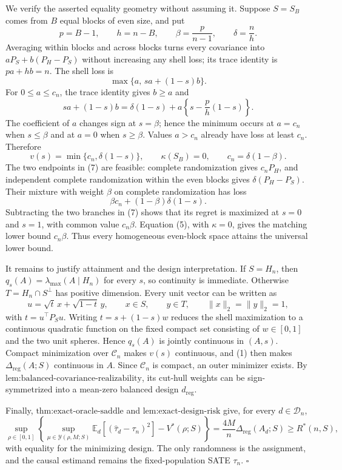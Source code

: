 We verify the asserted equality geometry without assuming it.  Suppose \(S=S_B\) comes from \(B\) equal blocks of even size, and put
\[
p=B-1,
\qquad
h=n-B,
\qquad
\beta=\frac{p}{n-1},
\qquad
\delta=\frac{n}{h}.
\]
Averaging within blocks and across blocks turns every covariance into \(aP_S+b(P_H-P_S)\) without increasing any shell loss; its trace identity is \(pa+hb=n\).  The shell loss is
\[
\max\{a,\,sa+(1-s)b\}.
\]
For \(0\leq a\leq c_n\), the trace identity gives \(b\geq a\) and
\[
sa+(1-s)b
=\delta(1-s)+a\left\{s-\frac{p}{h}(1-s)\right\}.
\]
The coefficient of \(a\) changes sign at \(s=\beta\); hence the minimum occurs at \(a=c_n\) when \(s\leq\beta\) and at \(a=0\) when \(s\geq\beta\).  Values \(a>c_n\) already have loss at least \(c_n\).  Therefore
\[
v(s)=\min\{c_n,\delta(1-s)\},
\qquad
\kappa(S_B)=0,
\qquad
c_n=\delta(1-\beta).
\tag{7}
\]
The two endpoints in (7) are feasible: complete randomization gives \(c_nP_H\), and independent complete randomization within the even blocks gives \(\delta(P_H-P_S)\).  Their mixture with weight \(\beta\) on complete randomization has loss
\[
\beta c_n+(1-\beta)\delta(1-s).
\]
Subtracting the two branches in (7) shows that its regret is maximized at \(s=0\) and \(s=1\), with common value \(c_n\beta\).  Equation (5), with \(\kappa=0\), gives the matching lower bound \(c_n\beta\).  Thus every homogeneous even-block space attains the universal lower bound.

It remains to justify attainment and the design interpretation.  If \(S=H_n\), then \(q_s(A)=\lambda_{\max}(A\mid H_n)\) for every \(s\), so continuity is immediate.  Otherwise \(T=H_n\cap S^\perp\) has positive dimension.  Every unit vector can be written as
\[
u=\sqrt{t}\,x+\sqrt{1-t}\,y,
\qquad
x\in S,
\qquad
y\in T,
\qquad
\|x\|_2=\|y\|_2=1,
\]
with \(t=u^\top P_Su\).  Writing \(t=s+(1-s)w\) reduces the shell maximization to a continuous quadratic function on the fixed compact set consisting of \(w\in[0,1]\) and the two unit spheres.  Hence \(q_s(A)\) is jointly continuous in \((A,s)\).  Compact minimization over \(\mathcal C_n\) makes \(v(s)\) continuous, and (1) then makes \(\Delta_{\mathrm{reg}}(A;S)\) continuous in \(A\).  Since \(\mathcal C_n\) is compact, an outer minimizer exists.  By \(\text{lem:balanced-covariance-realizability}\), its cut-hull weights can be sign-symmetrized into a mean-zero balanced design \(d_{\mathrm{reg}}\).

Finally, \(\text{thm:exact-oracle-saddle}\) and \(\text{lem:exact-design-risk}\) give, for every \(d\in\mathcal D_n\),
\[
\sup_{\rho\in[0,1]}
\left\{
\sup_{\mu\in\mathcal Y(\rho,M;S)}
\mathbb E_d[(\widehat\tau_d-\tau_n)^2]-V^*(\rho;S)
\right\}
=\frac{4M}{n}\Delta_{\mathrm{reg}}(A_d;S)
\geq R^*(n,S),
\]
with equality for the minimizing design.  The only randomness is the assignment, and the causal estimand remains the fixed-population SATE \(\tau_n\). \(\square\)